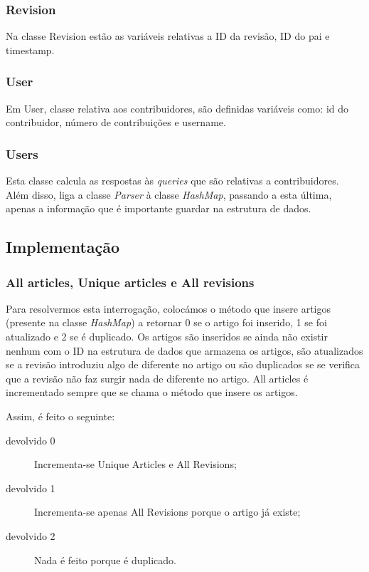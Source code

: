 \documentclass[a4paper]{article}
\begin{document}
\subsubsection{Revision}
Na classe Revision estão as variáveis relativas a ID da revisão, ID do pai e timestamp.

\subsubsection{User}
Em User, classe relativa aos contribuidores, são definidas variáveis como: id do contribuidor, número de contribuições e username.

\subsubsection{Users}
Esta classe calcula as respostas às \textit{queries} que são relativas a contribuidores. Além disso, liga a classe \textit{Parser} à classe \textit{\textit{HashMap}}, passando a esta última, apenas a informação que é importante guardar na estrutura de dados.

\subsection{Implementação}

\subsubsection{All articles, Unique articles e All revisions}
Para resolvermos esta interrogação, colocámos o método que insere artigos (presente na classe \textit{HashMap}) a retornar 0 se o artigo foi inserido, 1 se foi atualizado e 2 se é duplicado. Os artigos são inseridos se ainda não existir nenhum com o ID na estrutura de dados que armazena os artigos, são atualizados se a revisão introduziu algo de diferente no artigo ou são duplicados se se verifica que a revisão não faz surgir nada de diferente no artigo.
All articles é incrementado sempre que se chama o método que insere os artigos.

Assim, é feito o seguinte:
\begin{description}
\item[devolvido 0] Incrementa-se Unique Articles e All Revisions;
\item[devolvido 1] Incrementa-se apenas All Revisions porque o artigo já existe;
\item[devolvido 2] Nada é feito porque é duplicado.
\end{description}
\end{document}
